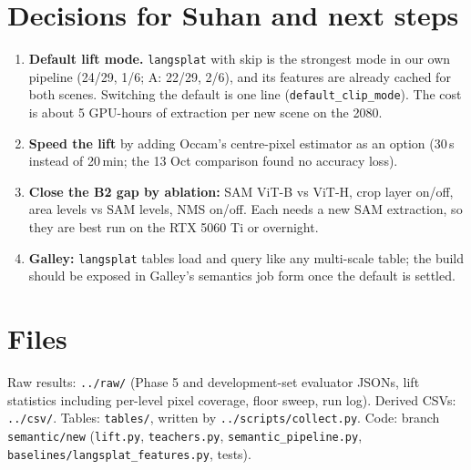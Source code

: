 \documentclass[11pt,a4paper]{article}
\newcommand{\code}[1]{\texttt{\small #1}}
\begin{document}
\section{Decisions for Suhan and next steps}
\begin{enumerate}[leftmargin=*,itemsep=2pt]
  \item \textbf{Default lift mode.} \code{langsplat} with skip is the strongest mode in our own pipeline (24/29, 1/6;
        A: 22/29, 2/6), and its features are already cached for both scenes. Switching the default is one line
        (\code{default\_clip\_mode}). The cost is about 5 GPU-hours of extraction per new scene on the 2080.
  \item \textbf{Speed the lift} by adding Occam's centre-pixel estimator as an option (30\,s instead of 20\,min; the
        13 Oct comparison found no accuracy loss).
  \item \textbf{Close the B2 gap by ablation:} SAM ViT-B vs ViT-H, crop layer on/off, area levels vs SAM levels, NMS
        on/off. Each needs a new SAM extraction, so they are best run on the RTX 5060 Ti or overnight.
  \item \textbf{Galley:} \code{langsplat} tables load and query like any multi-scale table; the build should be exposed
        in Galley's semantics job form once the default is settled.
\end{enumerate}

\section{Files}
Raw results: \code{../raw/} (Phase 5 and development-set evaluator JSONs, lift statistics including per-level pixel
coverage, floor sweep, run log). Derived CSVs: \code{../csv/}. Tables: \code{tables/}, written by
\code{../scripts/collect.py}. Code: branch \code{semantic/new} (\code{lift.py}, \code{teachers.py},
\code{semantic\_pipeline.py}, \code{baselines/langsplat\_features.py}, tests).
\end{document}
